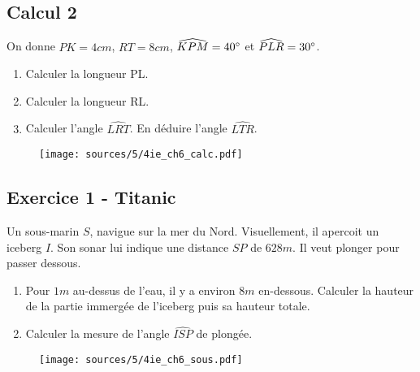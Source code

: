 \documentclass[10pt]{article}
\begin{document}
\begin{multicols}{2}
  \subsection*{Calcul 2}
  On donne $PK = 4cm$, $RT = 8cm$, $\widehat{KPM} = 40\degree$ et $\widehat{PLR} = 30\degree$.

  \begin{enumerate}
  \item[1.] Calculer la longueur PL.
  \item[2.] Calculer la longueur RL.
  \item[3.] Calculer l'angle $\widehat{LRT}$. En déduire l'angle $\widehat{LTR}$.
  \end{enumerate}

  \begin{figure}[H]
    \centering
    \texttt{[image: sources/5/4ie\_ch6\_calc.pdf]}
  \end{figure}

\end{multicols}

\begin{multicols}{2}
  \subsection*{Exercice 1 - Titanic} 

  Un sous-marin $S$, navigue sur la mer du Nord. Visuellement, il apercoit un iceberg $I$. Son sonar lui indique une distance $SP$ de $628m$. Il veut plonger pour passer dessous.

  \begin{enumerate}
  \item[1.] Pour $1m$ au-dessus de l'eau, il y a environ $8m$ en-dessous. Calculer la hauteur de la partie immergée de l'iceberg puis sa hauteur totale.
  \item[2.] Calculer la mesure de l'angle $\widehat{ISP}$ de plongée.
  \end{enumerate}

  \begin{figure}[H]
    \centering
    \texttt{[image: sources/5/4ie\_ch6\_sous.pdf]}
  \end{figure}
\end{multicols}
\end{document}
